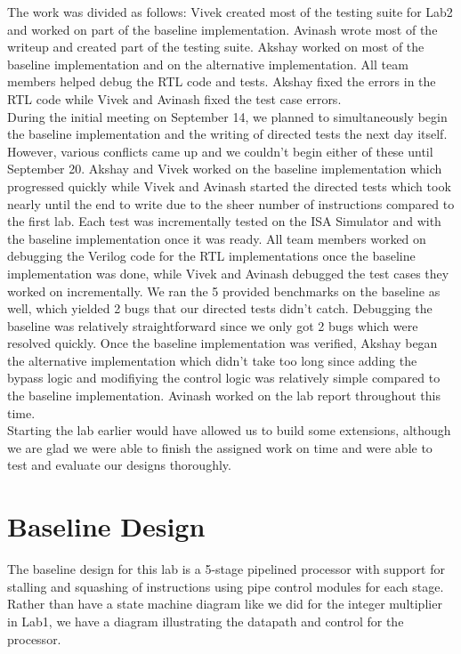 \documentclass[10pt]{article}
\begin{document}
The work was divided as follows:
Vivek created most of the testing suite for Lab2 and worked on part of the baseline implementation.
Avinash wrote most of the writeup and created part of the testing suite.
Akshay worked on most of the baseline implementation and on the alternative implementation. 
All team members helped debug the RTL code and tests.
Akshay fixed the errors in the RTL code while Vivek and Avinash fixed the test case errors. \\

During the initial meeting on September 14, we planned to simultaneously begin the baseline implementation and the writing of directed tests the next day itself. However, various conflicts came up and we couldn't begin either of these until September 20. Akshay and Vivek worked on the baseline implementation which progressed quickly while Vivek and Avinash started the directed tests which took nearly until the end to write due to the sheer number of instructions compared to the first lab. Each test was incrementally tested on the ISA Simulator and with the baseline implementation once it was ready. All team members worked on debugging the Verilog code for the RTL implementations once the baseline implementation was done, while Vivek and Avinash debugged the test cases they worked on incrementally. We ran the 5 provided benchmarks on the baseline as well, which yielded 2 bugs that our directed tests didn't catch. Debugging the baseline was relatively straightforward since we only got 2 bugs which were resolved quickly. Once the baseline implementation was verified, Akshay began the alternative implementation which didn't take too long since adding the bypass logic and modifiying the control logic was relatively simple compared to the baseline implementation. Avinash worked on the lab report throughout this time. \\

Starting the lab earlier would have allowed us to build some extensions, although we are glad we were able to finish the assigned work on time and were able to test and evaluate our designs thoroughly. 


\section{Baseline Design}

The baseline design for this lab is a 5-stage pipelined processor with support for stalling and squashing of instructions using pipe control modules for each stage. Rather than have a state machine diagram like we did for the integer multiplier in Lab1, we have a diagram illustrating the datapath and control for the processor. \\
\end{document}
